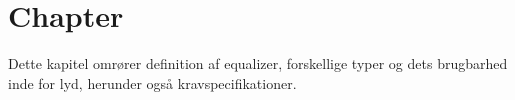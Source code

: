 \chapter{Chapter}\label{kap:chap1}



Dette kapitel omrører definition af equalizer, forskellige typer
og dets brugbarhed inde for lyd, herunder også kravspecifikationer.
